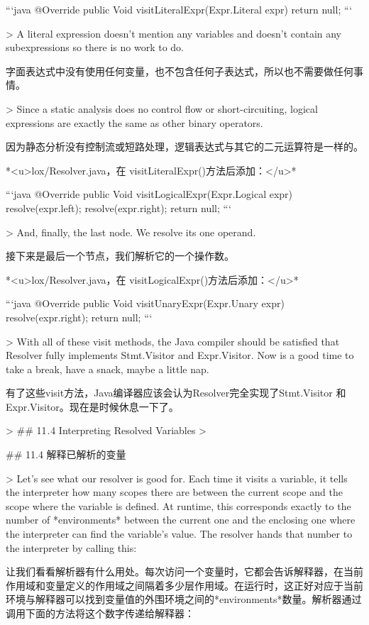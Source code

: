 \documentclass[cn,11pt,chinese]{elegantbook}
\begin{document}
{{{{{{{{{{{{{```java
  @Override
  public Void visitLiteralExpr(Expr.Literal expr) {
    return null;
  }
```

> A literal expression doesn’t mention any variables and doesn’t contain any subexpressions so there is no work to do.

字面表达式中没有使用任何变量，也不包含任何子表达式，所以也不需要做任何事情。

> Since a static analysis does no control flow or short-circuiting, logical expressions are exactly the same as other binary operators.

因为静态分析没有控制流或短路处理，逻辑表达式与其它的二元运算符是一样的。

*<u>lox/Resolver.java，在 visitLiteralExpr()方法后添加：</u>*

```java
  @Override
  public Void visitLogicalExpr(Expr.Logical expr) {
    resolve(expr.left);
    resolve(expr.right);
    return null;
  }
```

> And, finally, the last node. We resolve its one operand.

接下来是最后一个节点，我们解析它的一个操作数。

*<u>lox/Resolver.java，在 visitLogicalExpr()方法后添加：</u>*

```java
  @Override
  public Void visitUnaryExpr(Expr.Unary expr) {
    resolve(expr.right);
    return null;
  }
```

> With all of these visit methods, the Java compiler should be satisfied that Resolver fully implements Stmt.Visitor and Expr.Visitor. Now is a good time to take a break, have a snack, maybe a little nap.

有了这些visit方法，Java编译器应该会认为Resolver完全实现了Stmt.Visitor 和 Expr.Visitor。现在是时候休息一下了。

> ## 11 . 4 Interpreting Resolved Variables
>

## 11.4 解释已解析的变量

> Let’s see what our resolver is good for. Each time it visits a variable, it tells the interpreter how many scopes there are between the current scope and the scope where the variable is defined. At runtime, this corresponds exactly to the number of *environments* between the current one and the enclosing one where the interpreter can find the variable’s value. The resolver hands that number to the interpreter by calling this:

让我们看看解析器有什么用处。每次访问一个变量时，它都会告诉解释器，在当前作用域和变量定义的作用域之间隔着多少层作用域。在运行时，这正好对应于当前环境与解释器可以找到变量值的外围环境之间的*environments*数量。解析器通过调用下面的方法将这个数字传递给解释器：

}}}}}}}}}}}}}
\end{document}
